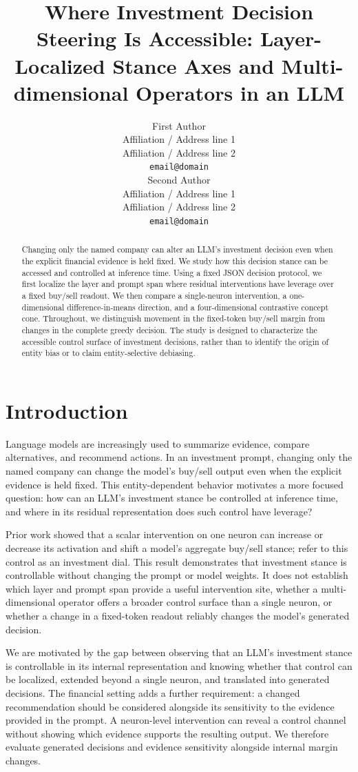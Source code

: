 \documentclass[11pt]{article}
\title{Where Investment Decision Steering Is Accessible: Layer-Localized Stance Axes and Multi-dimensional Operators in an LLM}
\author{First Author \\
  Affiliation / Address line 1 \\
  Affiliation / Address line 2 \\
  \texttt{email@domain} \\
  \And
  Second Author \\
  Affiliation / Address line 1 \\
  Affiliation / Address line 2 \\
  \texttt{email@domain} \\
}
\begin{document}
\maketitle

\begin{abstract}
Changing only the named company can alter an LLM's investment decision even when the explicit
financial evidence is held fixed. We study how this decision stance can be accessed and controlled
at inference time. Using a fixed JSON decision protocol, we first localize the layer and prompt
span where residual interventions have leverage over a fixed buy/sell readout. We then compare a
single-neuron intervention, a one-dimensional difference-in-means direction, and a four-dimensional
contrastive concept cone. Throughout, we distinguish movement in the fixed-token buy/sell margin
from changes in the complete greedy decision. The study is designed to characterize the accessible
control surface of investment decisions, rather than to identify the origin of entity bias or to
claim entity-selective debiasing.
\end{abstract}

\section{Introduction}

Language models are increasingly used to summarize evidence, compare alternatives, and recommend
actions. In an investment prompt, changing only the named company can change the model's buy/sell
output even when the explicit evidence is held fixed. This entity-dependent behavior motivates a
more focused question: how can an LLM's investment stance be controlled at inference time, and
where in its residual representation does such control have leverage?

Prior work showed that a scalar intervention on one neuron can increase or decrease its activation
and shift a model's aggregate buy/sell stance; \citet{park2026dial} refer to this control as an
investment dial. This result demonstrates that investment stance is controllable without changing
the prompt or model weights. It does not establish which layer and prompt span provide a useful
intervention site, whether a multi-dimensional operator offers a broader control surface than a
single neuron, or whether a change in a fixed-token readout reliably changes the model's generated
decision.

We are motivated by the gap between observing that an LLM's investment stance is controllable in
its internal representation and knowing whether that control can be localized, extended beyond a
single neuron, and translated into generated decisions. The financial setting adds a further
requirement: a changed recommendation should be considered alongside its sensitivity to the evidence
provided in the prompt. A neuron-level intervention can reveal a control channel without showing
which evidence supports the resulting output. We therefore evaluate generated decisions and evidence
sensitivity alongside internal margin changes.
\end{document}
